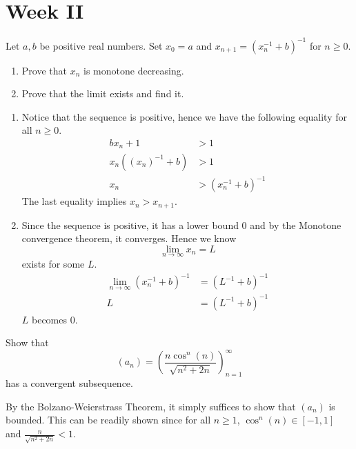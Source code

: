 \documentclass[../main.tex]{subfiles}
\begin{document}
\section{Week II}

\begin{problem}
Let $a, b$ be positive real numbers.
Set $x_0 = a$ and $x_{n + 1} = (x_n^{-1} + b)^{-1}$ for $n \ge 0$.
\begin{enumerate}[label=(\alph*)]
	\item Prove that $x_n$ is monotone decreasing.
	\item Prove that the limit exists and find it.
\end{enumerate}
\end{problem}
\begin{enumerate}[label=(\alph*)]
	\item Notice that the sequence is positive, hence we have the following equality for all $n \ge 0$.
	      \begin{align*}
		      b x_n + 1            & > 1                   \\
		      x_n ((x_n)^{-1} + b) & > 1                   \\
		      x_n                  & > (x_n^{-1} + b)^{-1}
	      \end{align*}
	      The last equality implies $x_n > x_{n + 1}$.
	\item Since the sequence is positive, it has a lower bound 0 and by the Monotone convergence theorem, it converges.
	      Hence we know
	      \[
		      \lim_{n \to \infty} x_n = L
	      \]
	      exists for some $L$.
	      \begin{align*}
		      \lim_{n \to \infty} (x_n^{-1} + b)^{-1}
		        & = (L^{-1} + b)^{-1} \\
		      L & = (L^{-1} + b)^{-1}
	      \end{align*}
	      $L$ becomes 0.
\end{enumerate}

\begin{problem}[\S2.7 A]
Show that
\[
	(a_n) = \left( \frac{n \cos^n(n)}{\sqrt{n^2 + 2n}} \right)_{n = 1}^\infty
\]
has a convergent subsequence.
\end{problem}
By the Bolzano-Weierstrass Theorem, it simply suffices to show that $(a_n)$ is bounded.
This can be readily shown since for all $n \ge 1$, $\cos^n(n) \in [-1, 1]$ and $\frac{n}{\sqrt{n^2 + 2n}} < 1$.
\end{document}
